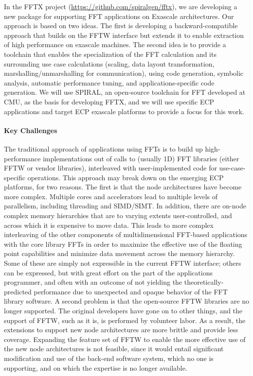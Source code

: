 In the FFTX project (\url{https://github.com/spiralgen/fftx}), 
we are developing a new package for supporting FFT applications on Exascale architectures. Our approach is based on two ideas. The first is developing a backward-compatible approach that builds on the FFTW interface but extends it to enable extraction of high performance on exascale machines. The second idea is to provide a toolchain that enables the
specialization of the FFT calculation and its surrounding use case calculations (scaling, data layout transformation, marshalling/unmarshalling for communication), using code generation, symbolic analysis, automatic performance tuning, and applications-specific code generation. We will use SPIRAL, an open-source toolchain for FFT developed at CMU, as the basis for developing FFTX, and we will use specific ECP applications and target ECP exascale platforms to provide a focus for this work.

\paragraph{Key Challenges}
The traditional approach of applications using FFTs is to build up high-performance implementations out of calls to (usually 1D) FFT libraries (either FFTW or vendor libraries), interleaved with user-implemented code for use-case-specific operations. This approach may break down on the emerging ECP platforms, for two reasons. The first is that the node architectures have become more complex. Multiple cores and accelerators lead to multiple levels of parallelism, including threading and SIMD/SIMT. In addition, there are on-node complex memory hierarchies that are to varying extents user-controlled, and across which it is expensive to move data. This leads to more complex interleaving of the other components of multidimensional FFT-based applications with the core library FFTs in order to maximize the effective use of the floating point capabilities and minimize data movement across the memory hierarchy. Some of these are simply not expressible in the current FFTW interface; others can be expressed, but with great effort on the part of the applications programmer, and often with an outcome of not yielding the theoretically-predicted performance due to unexpected and opaque behavior of the FFT library software. A second problem is that the open-source FFTW libraries are no longer supported. The original developers have gone on to other things, and the support of FFTW, such as it is, is performed by volunteer labor. As a result, the extensions to support new node architectures are more brittle and provide less coverage. Expanding the feature set of FFTW to enable the more effective use of the new node architectures is not feasible, since it would entail significant modification and use of the back-end software system, which no one is supporting, and on which the expertise is no longer available.

